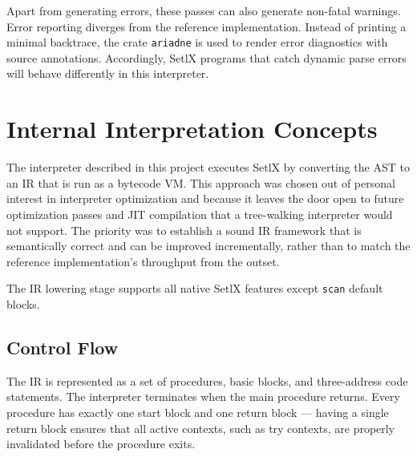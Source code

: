 Apart from generating errors, these passes can also generate non-fatal warnings. Error reporting diverges from the reference implementation. Instead of printing a minimal backtrace, the crate \texttt{ariadne}\cite{ariadne-source} is used to render error diagnostics with source annotations. Accordingly, SetlX programs that catch dynamic parse errors will behave differently in this interpreter.

\section{Internal Interpretation Concepts}

The interpreter described in this project executes SetlX by converting the \ac{AST} to an \ac{IR} that is run as a bytecode \ac{VM}. This approach was chosen out of personal interest in interpreter optimization and because it leaves the door open to future optimization passes and \ac{JIT} compilation that a tree-walking interpreter would not support. The priority was to establish a sound \ac{IR} framework that is semantically correct and can be improved incrementally, rather than to match the reference implementation's throughput from the outset.

The \ac{IR} lowering stage supports all native SetlX features except \texttt{scan} default blocks.

\subsection{Control Flow}

The \ac{IR} is represented as a set of procedures, basic blocks, and three-address code statements. The interpreter terminates when the main procedure returns. Every procedure has exactly one start block and one return block --- having a single return block ensures that all active contexts, such as try contexts, are properly invalidated before the procedure exits.

